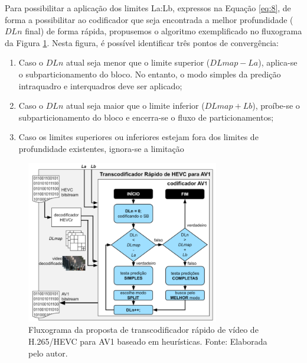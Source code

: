 

Para possibilitar a aplicação dos limites La:Lb, expressos na Equação \ref{eq:8}, de forma a possibilitar ao codificador que seja encontrada a melhor profundidade ($DLn$ final) de forma rápida, propusemos o algoritmo exemplificado no fluxograma da Figura \ref{fig:20}. Nesta figura, é possível identificar três pontos de convergência:

\begin{enumerate} [1.]
    \item Caso o $DLn$ atual seja menor que o limite superior ($DLmap - La$), aplica-se o subparticionamento do bloco. No entanto, o modo simples da predição intraquadro e interquadros deve ser aplicado;
    
    \item Caso o $DLn$ atual seja maior que o limite inferior ($DLmap + Lb$), proíbe-se o subparticionamento do bloco e encerra-se o fluxo de particionamentos;

    \item Caso os limites superiores ou inferiores estejam fora dos limites de profundidade existentes, ignora-se a limitação
    
\end{enumerate}

\begin{figure}
    \centering
    \includegraphics[width=0.75\textwidth]{FIGURES/fig_20.png}
    \caption{Fluxograma da proposta de transcodificador rápido de vídeo de H.265/HEVC para AV1 baseado em heurísticas. Fonte: Elaborada pelo autor.}
    \label{fig:20}
\end{figure}


